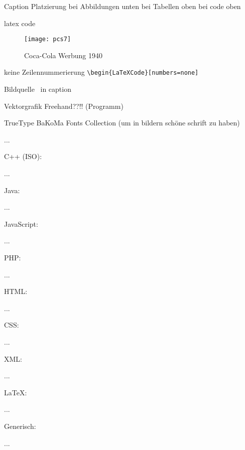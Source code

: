 \begin{comment} 
bild \{fig:CocaCola}
\begin{figure}
\centering
\texttt{[image: pcs7]} %
\caption{Coca-Cola Werbung 1940  }
\label{fig:CocaCola}
\end{figure}
\end{comment}



Caption Platzierung
bei Abbildungen unten
bei Tabellen oben
bei code oben


latex code
\begin{LaTeXCode}
\begin{figure}
    \centering
    \texttt{[image: pcs7]} %
    \caption{Coca-Cola Werbung 1940  }
    \label{fig:CocaCola}
\end{figure}
\end{LaTeXCode}


keine Zeilennummerierung
\verb|\begin{LaTeXCode}[numbers=none]|


Bildquelle~\cite{IBM360}
in caption


\begin{comment} 

Bild Rahmen
\FramePic{\texttt{[image: pcs7]}}
\end{comment}




Vektorgrafik Freehand??!! (Programm)

TrueType BaKoMa Fonts Collection (um in bildern schöne schrift zu haben)







\begin{CCode}
	...
\end{CCode}
C++ (ISO):
\begin{CppCode}
	...
\end{CppCode}
Java:
\begin{JavaCode}
	...
\end{JavaCode}
JavaScript:
\begin{JsCode}
	...
\end{JsCode}
PHP:
\begin{PhpCode}
	...
\end{PhpCode}
HTML:
\begin{HtmlCode}
	...
\end{HtmlCode}
CSS:
\begin{CssCode}
	...
\end{CssCode}
XML:
\begin{XmlCode}
	...
\end{XmlCode}
LaTeX:
\begin{LaTeXCode}
	...
\end{LaTeXCode}
Generisch:
\begin{GenericCode}
	...
\end{GenericCode}

